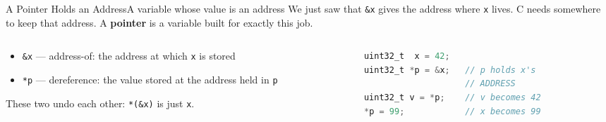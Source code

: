 \documentclass[9pt,aspectratio=169,xcolor=table]{beamer}
\begin{document}
\begin{frame}[fragile]{A Pointer Holds an Address}{A variable whose value is an address}
    \leavevmode
    We just saw that \texttt{\&x} gives the address where \texttt{x} lives.
    C needs somewhere to \alert{keep} that address. A \textbf{pointer} is a
    variable built for exactly this job.

    \vspace{2mm}
    \begin{columns}[T]
    \begin{column}{.48\textwidth}
        \begin{itemize}
            \item \texttt{\&x} --- \alert{address-of}: the address at which
                  \texttt{x} is stored
            \item \texttt{*p} --- \alert{dereference}: the value stored at the
                  address held in \texttt{p}
        \end{itemize}
        \vspace{1mm}
        {\small These two undo each other: \texttt{*(\&x)} is just
        \texttt{x}.}
    \end{column}
    \begin{column}{.48\textwidth}
\begin{lstlisting}[language=C, basicstyle=\ttfamily\footnotesize]
uint32_t  x = 42;
uint32_t *p = &x;   // p holds x's
                    // ADDRESS
uint32_t v = *p;    // v becomes 42
*p = 99;            // x becomes 99
\end{lstlisting}
    \end{column}
    \end{columns}

    \vspace{2mm}
    \begin{center}
    \end{center}
\end{frame}
\end{document}

